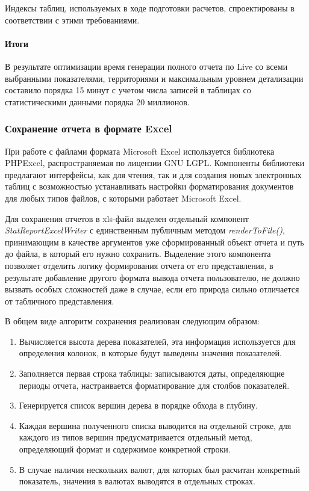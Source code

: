 Индексы таблиц, используемых в ходе подготовки расчетов, спроектированы в соответствии
с этими требованиями.

\paragraph{Итоги}
В результате оптимизации время генерации полного отчета по Live со всеми выбранными показателями,
территориями и максимальным уровнем детализации составило порядка 15 минут с учетом числа записей
в таблицах со статистическими данными порядка 20 миллионов.

\subsubsection{Сохранение отчета в формате Excel}
При работе с файлами формата Microsoft Excel используется библиотека PHPExcel\cite{phpexcel},
распространяемая по лицензии GNU LGPL. Компоненты библиотеки предлагают интерфейсы, как
для чтения, так и для создания новых электронных таблиц с возможностью устанавливать
настройки форматирования документов для любых типов файлов, с которыми работает Microsoft Excel.

Для сохранения отчетов в xls-файл выделен отдельный компонент \textit{StatReportExcelWriter}
с единственным публичным методом \textit{renderToFile()}, принимающим в качестве аргументов уже
сформированный объект отчета и путь до файла, в который его нужно сохранить.
Выделение этого компонента позволяет отделить логику формирования отчета от его представления, 
в результате добавление другого формата вывода отчета пользователю, не должно вызвать особых 
сложностей даже в случае, если его природа сильно отличается от табличного представления.

В общем виде алгоритм сохранения реализован следующим образом:
\begin{enumerate}
\item{
  Вычисляется высота дерева показателей, эта информация используется для определения колонок, в которые будут выведены
значения показателей.
}
\item{
  Заполняется первая строка таблицы: записываются даты, определяющие периоды отчета, настраивается форматирование
для столбов показателей.
}
\item{
  Генерируется список вершин дерева в порядке обхода в глубину.
}
\item{
  Каждая вершина полученного списка выводится на отдельной строке, для каждого из типов вершин
предусматривается отдельный метод, определяющий формат и содержимое конкретной строки.
}
\item{
  В случае наличия нескольких валют, для которых был расчитан конкретный показатель, значения в валютах выводятся в 
  отдельных строках.
}
\end{enumerate}


